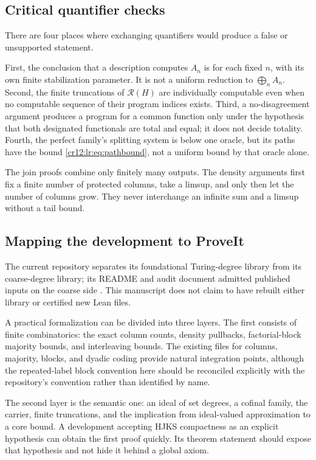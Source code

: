 \documentclass[11pt,letterpaper]{article}
\theoremstyle{plain}
\theoremstyle{definition}
\theoremstyle{remark}
\numberwithin{equation}{section}
\newcommand{\Rcode}{\mathcal R}
\begin{document}
\subsection{Critical quantifier checks}
There are four places where exchanging quantifiers would produce a false or
unsupported statement.

First, the conclusion that a description computes $A_n$ is for each fixed $n$, with
its own finite stabilization parameter. It is not a uniform reduction to
$\bigoplus_n A_n$. Second, the finite truncations of $\Rcode(H)$ are individually
computable even when no computable sequence of their program indices exists. Third, a
no-disagreement argument produces a program for a common function only under the
hypothesis that both designated functionals are total and equal; it does not decide
totality. Fourth, the perfect family's splitting system is below one oracle, but its
paths have the bound \eqref{cr12:lr:eq:pathbound}, not a uniform bound by that oracle
alone.

The join proofs combine only finitely many outputs. The density arguments first fix a
finite number of protected columns, take a limsup, and only then let the number of
columns grow. They never interchange an infinite sum and a limsup without a tail
bound.

\subsection{Mapping the development to ProveIt}\label{cr12:lr:subsec:mapping}
The current repository separates its foundational Turing-degree library from its
coarse-degree library; its README and audit document admitted published inputs on the
coarse side \cite{RepoReadme}. This manuscript does not claim to have rebuilt either
library or certified new Lean files.

A practical formalization can be divided into three layers. The first consists of
finite combinatorics: the exact column counts, density pullbacks, factorial-block
majority bounds, and interleaving bounds. The existing files for columns, majority,
blocks, and dyadic coding provide natural integration points, although the
repeated-label block convention here should be reconciled explicitly with the
repository's convention rather than identified by name.

The second layer is the semantic one: an ideal of set degrees, a cofinal family, the
carrier, finite truncations, and the implication from ideal-valued approximation to a
core bound. A development accepting HJKS compactness as an explicit hypothesis can
obtain the first proof quickly. Its theorem statement should expose that hypothesis
and not hide it behind a global axiom.
\end{document}
